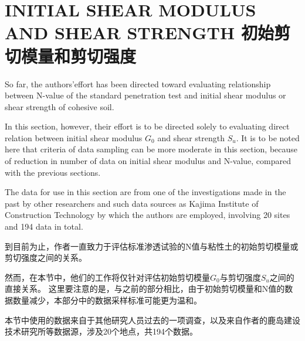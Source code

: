 \section{INITIAL SHEAR MODULUS AND SHEAR STRENGTH 初始剪切模量和剪切强度}

\begin{paracol}{2}
    
    So far, the authors'effort has been directed toward evaluating relationship between N-value of the standard penetration test and initial shear modulus or shear strength of cohesive soil.
    
    In this section, however, their effort is to be directed solely to evaluating direct relation between initial shear modulus $G_0$ and shear strength $S_u$. It is to be noted here that criteria of data sampling can be more moderate in this section, because of reduction in number of data on initial shear modulus and N-value, compared with the previous sections.
    
    The data for use in this section are from one of the investigations made in the past by other researchers\citet{Shima19681301, Shima1969819} and such data sources as Kajima Institute of Construction Technology by which the authors are employed, involving 20 sites and 194 data in total.

    \switchcolumn

    到目前为止，作者一直致力于评估标准渗透试验的N值与粘性土的初始剪切模量或剪切强度之间的关系。
            
    然而，在本节中，他们的工作将仅针对评估初始剪切模量$G_0$与剪切强度$S_u$之间的直接关系。 这里要注意的是，与之前的部分相比，由于初始剪切模量和N值的数据数量减少，本部分中的数据采样标准可能更为温和。
            
    本节中使用的数据来自于其他研究人员\citet{Shima19681301, Shima1969819}过去的一项调查，以及来自作者的鹿岛建设技术研究所等数据源，涉及20个地点，共194个数据。
    
\end{paracol}


